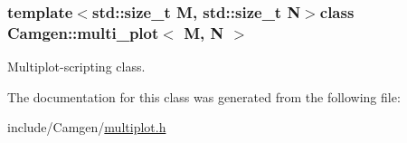 \subsubsection*{template$<$std\+::size\+\_\+t M, std\+::size\+\_\+t N$>$class Camgen\+::multi\+\_\+plot$<$ M, N $>$}

Multiplot-\/scripting class. 

The documentation for this class was generated from the following file\+:\begin{DoxyCompactItemize}
\item 
include/\+Camgen/\hyperlink{a00699}{multiplot.\+h}\end{DoxyCompactItemize}

